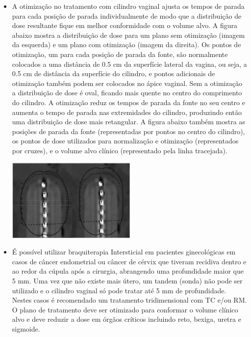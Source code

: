 \documentclass[11pt,a4paper]{article}
\newcounter{exemplo}
\begin{document}
\begin{exemplo}[8. Braquiterapia]
\begin{itemize}
        \item A otimização no tratamento com cilindro vaginal ajusta os tempos de parada para cada posição de parada individualmente de modo que a distribuição de dose resultante fique em melhor conformidade com o volume alvo. A figura abaixo mostra a distribuição de dose para um plano sem otimização (imagem da esquerda) e um plano com otimização (imagem da direita). Os pontos de otimização, um para cada posição de parada da fonte, são normalmente colocados a uma distância de 0.5 cm da superfície lateral da vagina, ou seja, a 0.5 cm de distância da superfície do cilindro, e pontos adicionais de otimização também podem ser colocados no ápice vaginal. Sem a otimização  a distribuição de dose é oval, ficando mais quente no centro do comprimento do cilindro. A otimização reduz os tempos de parada da fonte no seu centro e aumenta o tempo de parada nas extremidades do cilindro, produzindo então uma distribuição de dose mais retangular. A figura abaixo também mostra as posições de parada da fonte (representadas por pontos no centro do cilindro), os pontos de dose utilizados para normalização e otimização (representados por cruzes), e o volume alvo clínico (representado pela linha tracejada).

            \begin{center}
                \includegraphics[width=0.5\textwidth]{Imagens/cilindroDose.JPG}
            \end{center}
            
        \item É possível utilizar braquiterapia Intersticial em pacientes ginecológicas em casos de câncer endometrial ou câncer de cérvix que tiveram recidiva dentro e ao redor da cúpula após a cirurgia, abrangendo uma profundidade maior que 5 mm. Uma vez que não existe mais útero, um tandem (sonda) não pode ser utilizado e o cilindro vaginal só pode tratar até 5 mm de profundidade. Nestes casos é recomendado um tratamento tridimensional com TC e/ou RM. O plano de tratamento deve ser otimizado para conformar o volume clínico alvo e deve reduzir a dose em órgãos críticos incluindo reto, bexiga, uretra e sigmoide.
        

\end{itemize}
\end{exemplo}
\end{document}
